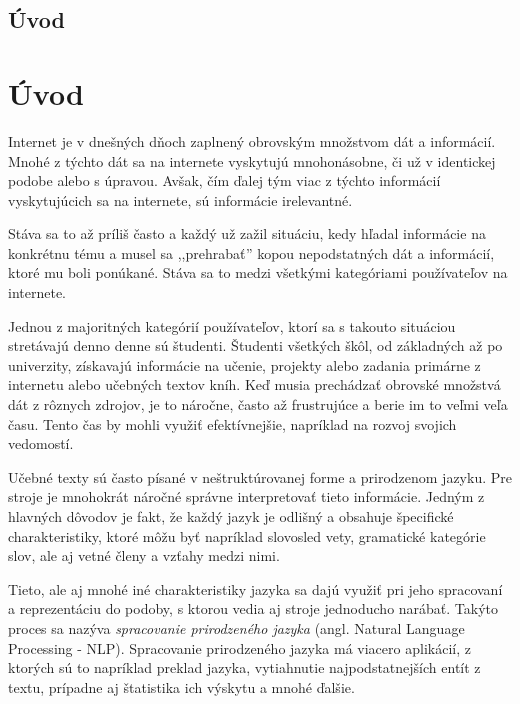\newpage
{}
{
	\section{Úvod}
}
{
	\chapter{Úvod}
}
Internet je v dnešných dňoch zaplnený obrovským množstvom dát a informácií. Mnohé z týchto dát sa na internete vyskytujú mnohonásobne, či už v identickej podobe alebo s úpravou. Avšak, čím ďalej tým viac z týchto informácií vyskytujúcich sa na internete, sú informácie irelevantné.

Stáva sa to až príliš často a každý už zažil situáciu, kedy hľadal informácie na konkrétnu tému a musel sa ,,prehrabať'' kopou nepodstatných dát a informácií, ktoré mu boli ponúkané. Stáva sa to medzi všetkými kategóriami používateľov na internete.

Jednou z majoritných kategórií používateľov, ktorí sa s takouto situáciou stretávajú denno denne sú študenti. Študenti všetkých škôl, od základných až po univerzity, získavajú informácie na učenie, projekty alebo zadania primárne z internetu alebo učebných textov kníh. Keď musia prechádzať obrovské množstvá dát z rôznych zdrojov, je to náročne, často až frustrujúce a berie im to veľmi veľa času. Tento čas by mohli využiť efektívnejšie, napríklad na rozvoj svojich vedomostí.

Učebné texty sú často písané v neštruktúrovanej forme a prirodzenom jazyku. Pre stroje je mnohokrát náročné správne interpretovať tieto informácie. Jedným z hlavných dôvodov je fakt, že každý jazyk je odlišný a obsahuje špecifické charakteristiky, ktoré môžu byť napríklad slovosled vety, gramatické kategórie slov, ale aj vetné členy a vzťahy medzi nimi.

Tieto, ale aj mnohé iné charakteristiky jazyka sa dajú využiť pri jeho spracovaní a reprezentáciu do podoby, s ktorou vedia aj stroje jednoducho narábať. Takýto proces sa nazýva \textit{spracovanie prirodzeného jazyka} (angl. Natural Language Processing - NLP). Spracovanie prirodzeného jazyka má viacero aplikácií, z ktorých sú to napríklad preklad jazyka, vytiahnutie najpodstatnejších entít z textu, prípadne aj štatistika ich výskytu a mnohé ďalšie.

